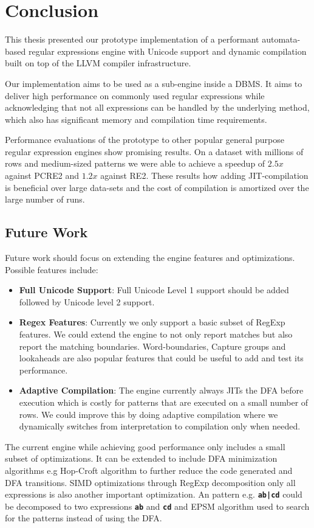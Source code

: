 \chapter{Conclusion}\label{chapter:conclusion}
This thesis presented our prototype implementation of a performant automata-based regular expressions engine with Unicode support and dynamic compilation built on top of the LLVM compiler infrastructure.

Our implementation aims to be used as a sub-engine inside a DBMS. It aims to deliver high performance on commonly used regular expressions while acknowledging that not all expressions can be handled by the underlying method, which also has significant memory and compilation time requirements.

Performance evaluations of the prototype to other popular general purpose regular expression engines show promising results. On a dataset with millions of rows and medium-sized patterns we were able to achieve a speedup of $2.5x$ against PCRE2 and $1.2x$ against RE2. These results how adding JIT-compilation is beneficial over large data-sets and the cost of compilation is amortized over the large number
of runs.

\section{Future Work}

Future work should focus on extending the engine features and optimizations. Possible features include:
\begin{itemize}
    \item \textbf{Full Unicode Support}: Full Unicode Level 1 support should be added followed by Unicode level 2 support.
    \item \textbf{Regex Features}: Currently we only support a basic subset of RegExp features. We could extend the engine to not only report matches but also report the matching boundaries. Word-boundaries, Capture groups and lookaheads are also popular features that could be useful to add and test its performance.  
    \item \textbf{Adaptive Compilation}: The engine currently always JITs the DFA before execution which is costly for patterns that are executed on a small number of rows. We could improve this by doing adaptive compilation where we dynamically switches from interpretation to compilation only when needed.
\end{itemize}

The current engine while achieving good performance only includes a small subset of optimizations. It can be extended to include  DFA minimization algorithms e.g Hop-Croft algorithm to further reduce the code generated and DFA transitions. SIMD optimizations through RegExp decomposition only all expressions is also another important optimization. An pattern e.g. \texttt{\textbf{ab|cd}} could be decomposed to two expressions \texttt{\textbf{ab}} and \texttt{\textbf{cd}} and EPSM algorithm used to search for the patterns instead of using the DFA.